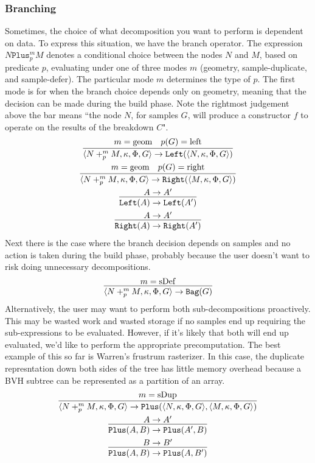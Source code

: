 \documentclass{article}
\newcommand {\sleft}{\mathtt{Left}}
\newcommand {\sright}{\mathtt{Right}}
\newcommand {\bag}{\mathtt{Bag}}
\newcommand {\plus}{\mathtt{Plus}}
\begin{document}
\subsubsection{Branching}
Sometimes, the choice of what decomposition you want to perform is dependent on data.  To express this situation, we have the branch operator.    The expression $N \plus_p^m M$ denotes a conditional choice between the nodes $N$ and $M$, based on predicate $p$, evaluating under one of three modes $m$ (geometry, sample-duplicate, and sample-defer).  The particular mode $m$ determines the type of $p$.  The first mode is for when the branch choice depends only on geometry, meaning that the decision can be made during the build phase.  Note the rightmost judgement above the bar means ``the node $N$, for samples $G$, will produce a constructor $f$ to operate on the results of the breakdown $C$".
\begin{gather}
\infer{\langle N +_p^m M, \kappa, \Phi, G \rangle \to \sleft(\langle N, \kappa, \Phi, G \rangle)}{m={\rm geom} & p(G) = \mathrm{left}}
\\
\infer{\langle N +_p^m M, \kappa, \Phi, G \rangle \to \sright(\langle M, \kappa, \Phi, G \rangle)}{m={\rm geom} & p(G) = \mathrm{right}}
\\
\infer{\sleft(A) \to \sleft(A')}{A \to A'}
\\
\infer{\sright(A) \to \sright(A')}{A \to A'}
\end{gather}
Next there is the case where the branch decision depends on samples and no action is taken during the build phase, probably because the user doesn't want to risk doing unnecessary decompositions.
\begin{gather}
\infer{\langle N +_p^m M, \kappa, \Phi, G \rangle \to \bag(G)}{m={\rm sDef}}
\end{gather}
Alternatively, the user may want to perform both sub-decompositions proactively.  This may be wasted work and wasted storage if no samples end up requiring the sub-expressions to be evaluated.  However, if it's likely that both will end up evaluated, we'd like to perform the appropriate precomputation.  The best example of this so far is Warren's frustrum rasterizer.  In this case, the duplicate represntation down both sides of the tree has little memory overhead because a BVH subtree can be represented as a partition of an array. 
\begin{gather}
\infer{\langle N +_p^m M, \kappa, \Phi, G \rangle \to \plus(\langle N, \kappa, \Phi, G \rangle, \langle M, \kappa, \Phi, G \rangle)}{m={\rm sDup}}
\\
\infer{\plus(A, B) \to \plus(A', B)}{A \to A'}
\\
\infer{\plus(A, B) \to \plus(A, B')}{B \to B'}
\end{gather}
\end{document}
